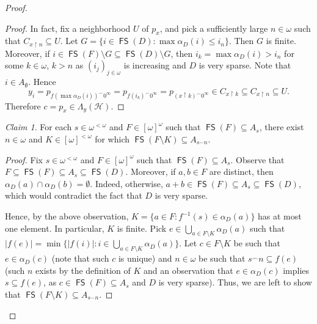\documentclass{amsart}
\theoremstyle{plain}
\theoremstyle{definition}
\theoremstyle{remark}
\newtheorem{claim}{Claim}
\DeclareMathOperator{\FS}{\mathsf{FS}}
\begin{document}
\begin{proof}
\begin{proof}
     In fact, fix a neighborhood $U$ of $p_x$, and pick a sufficiently large $n \in \omega$ such that $C_{x\restriction n}\subseteq U$. 
     Let $G=\{i\in\FS(D): \max\alpha_D(i)\leq i_n\}$. Then $G$ is finite. Moreover, if $i\in \FS(F)\setminus G\subseteq\FS(D)\setminus G$, then $i_k=\max\alpha_D(i)>i_n$ for some $k\in\omega$, $k>n$ as $(i_j)_{j\in\omega}$ is increasing and $D$ is very sparse. Note that $i\in A_\emptyset$. Hence 
     $$
     y_{i}=p_{f(\max\alpha_D(i))^\frown 0^\infty}=p_{f(i_k)^\frown 0^\infty}=p_{(x\restriction k)^\frown 0^\infty}\in C_{x\restriction k}\subseteq C_{x\restriction n}\subseteq U.
     $$
Therefore $c=p_x \in \Lambda_y(\mathcal{H})$. 
\end{proof}

\begin{claim}\label{claim:middleB}
    For each $s\in\omega^{<\omega}$ and $F\in[\omega]^\omega$ such that $\FS(F)\subseteq A_s$, 
    there exist $n\in\omega$ and $K\in[\omega]^{<\omega}$ for which $\FS(F\setminus K)\subseteq A_{s^\frown n}$. 
\end{claim}
\begin{proof}
    Fix $s\in\omega^{<\omega}$ and $F\in[\omega]^\omega$ such that $\FS(F)\subseteq A_s$. Observe that $F\subseteq\FS(F)\subseteq A_s\subseteq\FS(D)$. Moreover, if $a,b\in F$ are distinct, then $\alpha_D(a)\cap\alpha_D(b)=\emptyset$. Indeed, otherwise,  $a+b\in\FS(F)\subseteq A_s\subseteq\FS(D)$, which would contradict the fact that $D$ is very sparse. 

Hence, by the above observation, $K=\{a\in F:f^{-1}(s)\in\alpha_D(a)\}$ has at most one element. In particular, $K$ is finite. Pick $e\in \bigcup_{a\in F\setminus K}\alpha_D(a)$ such that $|f(e)|=\min\{|f(i)|: i\in\bigcup_{a\in F\setminus K}\alpha_D(a)\}$. Let $c\in F\setminus K$ be such that $e\in\alpha_D(c)$ (note that such $c$ is unique) and $n\in\omega$ be such that $s^\frown n\subseteq f(e)$ (such $n$ exists by the definition of $K$ and an observation that $e\in\alpha_D(c)$ implies $s\subseteq f(e)$, as $c\in \FS(F)\subseteq A_s$ and $D$ is very sparse). Thus, we are left to show that $\FS(F\setminus K)\subseteq A_{s^\frown n}$.


\end{proof}
\end{proof}
\end{document}

